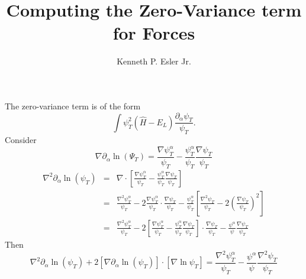 \documentclass{article}
\author{Kenneth P. Esler Jr.}
\title{Computing the Zero-Variance term for Forces}
\begin{document}
\maketitle
The zero-variance term is of the form
\begin{equation}
\int \psi_T^2 (\hat{H} - E_L) \frac{\partial_\alpha \psi_T}{\psi_T}.
\end{equation}
Consider
\begin{equation}
\nabla \partial_\alpha \ln(\Psi_T) = \frac{\nabla \psi^\alpha_T}{\psi_T} - \frac{\psi^\alpha_T}{\psi_T} \frac{\nabla \psi_T}{\psi_T} 
\end{equation}
\begin{eqnarray}
\nabla^2\partial_\alpha \ln(\psi_T) & = & \nabla\cdot \left[
\frac{\nabla \psi^\alpha_T}{\psi_T} - \frac{\psi^\alpha_T}{\psi_T} \frac{\nabla \psi_T}{\psi_T} \right] \\
& = & \frac{\nabla^2 \psi^\alpha_T}{\psi_T} - 2\frac{\nabla \psi^{\alpha}_T}{\psi_T} \cdot \frac{\nabla \psi_T}{\psi_T} - \frac{\psi^\alpha_T}{\psi_T} \left[\frac{\nabla^2\psi_T}{\psi_T} - 2\left(\frac{\nabla\psi_T}{\psi_T}\right)^2\right] \\
& = & \frac{\nabla^2 \psi_T^\alpha}{\psi_T} - 2\left[\frac{\nabla \psi_T^\alpha}{\psi_T} - \frac{\psi^\alpha_T}{\psi_T}\frac{\nabla\psi_T}{\psi_T}\right]\cdot \frac{\nabla \psi_T}{\psi_T} - \frac{\psi^\alpha}{\psi} \frac{\nabla \psi_T}{\psi_T} 
\end{eqnarray}
Then
\begin{equation}
 \nabla^2 \partial_\alpha \ln(\psi_T) + 2 \left[\nabla \partial_\alpha \ln(\psi_T)\right]\cdot \left[\nabla \ln{\psi_T}\right]  =  \frac{\nabla^2 \psi_T^\alpha}{\psi_T} - \frac{\psi^\alpha}{\psi} \frac{\nabla^2 \psi_T}{\psi_T}
\end{equation}
\end{document}
